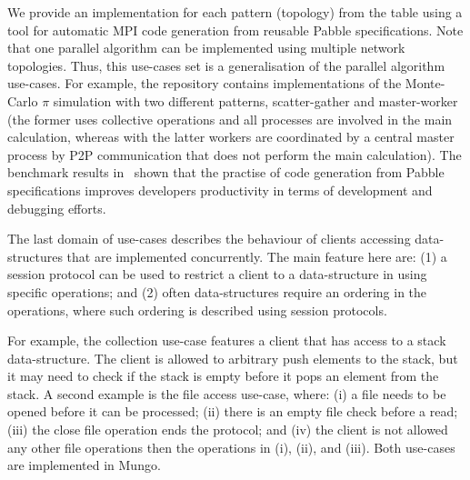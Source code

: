 
We provide an implementation for each pattern (topology) from the table using a tool for automatic MPI code generation
from reusable Pabble specifications. Note that one parallel algorithm can be implemented using multiple network topologies. Thus, this use-cases set is a generalisation of the parallel algorithm use-cases. For example, the repository contains implementations of the Monte-Carlo $\pi$ simulation with two different patterns, scatter-gather and master-worker (the former uses collective operations and all processes are involved in the main calculation, whereas with the latter
workers are coordinated by a central master process by P2P communication that does not perform the main calculation).
The benchmark results in~\cite{NCY2015} shown that the practise
of code generation from Pabble specifications improves developers
productivity in terms of development and debugging efforts.


The last domain of use-cases describes the behaviour of
clients accessing data-structures that are implemented
concurrently. The main feature here are:
(1) a session protocol can be used to restrict
a client to a data-structure in using specific operations; and
(2) often data-structures require an ordering in the
operations, where such ordering is described using session protocols.

For example, the collection use-case features a client
that has access to a stack data-structure. The client
is allowed to arbitrary push elements to the stack, but
it may need to check if the stack is empty before it
pops an element from the stack.
A second example is the file access use-case, where:
(i) a file needs to be opened before it can be processed;
(ii) there is an empty file check before a read;
(iii) the close file operation ends the protocol; and
(iv) the client is not allowed any other file operations then
the operations in (i), (ii), and (iii).
Both use-cases are implemented in Mungo.

